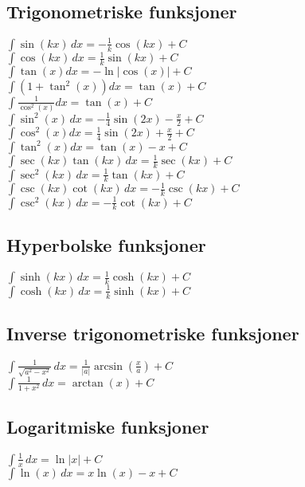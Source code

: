 \documentclass[a4paper,7pt,fleqn]{article}
\begin{document}
\begin{multicols}{2}
\begin{minipage}{\linewidth}
\subsection*{Trigonometriske funksjoner}
\(\int \sin(kx) \, dx = -\frac{1}{k} \cos(kx) + C\) \\
\(\int \cos(kx) \, dx = \frac{1}{k} \sin(kx) + C\) \\
\(\int \tan(x) dx = -\ln|\cos(x)| + C\) \\
\(\int (1+\tan^2(x)) dx = \tan(x) + C\) \\
\(\int \frac{1}{\cos^2(x)} dx = \tan(x) + C\) \\
\(\int \sin^2(x) \, dx = -\frac{1}{4} \sin(2x) - \frac{x}{2} + C\) \\
\(\int \cos^2(x) dx = \frac{1}{4} \sin(2x) + \frac{x}{2} + C\) \\
\(\int \tan^2(x) dx = \tan(x) - x + C\) \\
\(\int \sec(kx) \tan(kx) \, dx = \frac{1}{k} \sec(kx) + C\) \\
\(\int \sec^2(kx) \, dx = \frac{1}{k} \tan(kx) + C\) \\
\(\int \csc(kx) \cot(kx) \, dx = -\frac{1}{k} \csc(kx) + C\) \\
\(\int \csc^2(kx) \, dx = -\frac{1}{k} \cot(kx) + C\) \\


\subsection*{Hyperbolske funksjoner}
\(\int \sinh(kx) \, dx = \frac{1}{k} \cosh(kx) + C\) \\
\(\int \cosh(kx) \, dx = \frac{1}{k} \sinh(kx) + C\) \\
\end{minipage}

\begin{minipage}{\linewidth}
\subsection*{Inverse trigonometriske funksjoner}
\(\int \frac{1}{\sqrt{a^2 - x^2}} \, dx = \frac{1}{|a|} \arcsin \left( \frac{x}{a} \right) + C\) \\
\(\int \frac{1}{1 + x^2} \, dx = \arctan(x) + C\) \\

\subsection*{Logaritmiske funksjoner}
\(\int \frac{1}{x} \, dx = \ln|x| + C\) \\
\(\int \ln(x) \, dx = x\ln(x) - x + C\) \\


\end{minipage}
\end{multicols}
\end{document}
